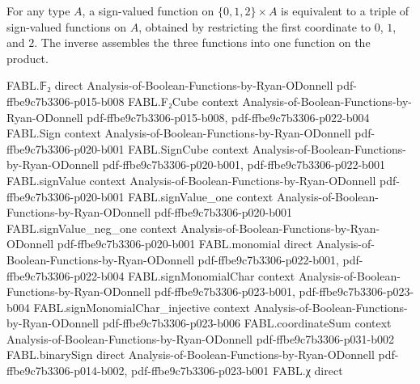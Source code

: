 \begin{definition}
\label{FABL.splitThreeBlocksEquiv}
\leanok
{}
For any type $A$, a sign-valued function on $\{0,1,2\}\times A$ is equivalent to a
triple of sign-valued functions on $A$, obtained by restricting the first coordinate to
$0$, $1$, and $2$. The inverse assembles the three functions into one function on the
product.
\end{definition}

\begin{theorem}
\label{FABL.signValue_majority_three}
\leanok
{}
\proofstep
  {FABL.𝔽₂}
  {direct}
  {Analysis-of-Boolean-Functions-by-Ryan-ODonnell}
  {pdf-ffbe9c7b3306-p015-b008}
\proofstep
  {FABL.F₂Cube}
  {context}
  {Analysis-of-Boolean-Functions-by-Ryan-ODonnell}
  {pdf-ffbe9c7b3306-p015-b008,
    pdf-ffbe9c7b3306-p022-b004}
\proofstep
  {FABL.Sign}
  {context}
  {Analysis-of-Boolean-Functions-by-Ryan-ODonnell}
  {pdf-ffbe9c7b3306-p020-b001}
\proofstep
  {FABL.SignCube}
  {context}
  {Analysis-of-Boolean-Functions-by-Ryan-ODonnell}
  {pdf-ffbe9c7b3306-p020-b001,
    pdf-ffbe9c7b3306-p022-b001}
\proofstep
  {FABL.signValue}
  {context}
  {Analysis-of-Boolean-Functions-by-Ryan-ODonnell}
  {pdf-ffbe9c7b3306-p020-b001}
\proofstep
  {FABL.signValue_one}
  {context}
  {Analysis-of-Boolean-Functions-by-Ryan-ODonnell}
  {pdf-ffbe9c7b3306-p020-b001}
\proofstep
  {FABL.signValue_neg_one}
  {context}
  {Analysis-of-Boolean-Functions-by-Ryan-ODonnell}
  {pdf-ffbe9c7b3306-p020-b001}
\proofstep
  {FABL.monomial}
  {direct}
  {Analysis-of-Boolean-Functions-by-Ryan-ODonnell}
  {pdf-ffbe9c7b3306-p022-b001,
    pdf-ffbe9c7b3306-p022-b004}
\proofstep
  {FABL.signMonomialChar}
  {context}
  {Analysis-of-Boolean-Functions-by-Ryan-ODonnell}
  {pdf-ffbe9c7b3306-p023-b001,
    pdf-ffbe9c7b3306-p023-b004}
\proofstep
  {FABL.signMonomialChar_injective}
  {context}
  {Analysis-of-Boolean-Functions-by-Ryan-ODonnell}
  {pdf-ffbe9c7b3306-p023-b006}
\proofstep
  {FABL.coordinateSum}
  {context}
  {Analysis-of-Boolean-Functions-by-Ryan-ODonnell}
  {pdf-ffbe9c7b3306-p031-b002}
\proofstep
  {FABL.binarySign}
  {direct}
  {Analysis-of-Boolean-Functions-by-Ryan-ODonnell}
  {pdf-ffbe9c7b3306-p014-b002,
    pdf-ffbe9c7b3306-p023-b001}
\proofstep
  {FABL.χ}
  {direct}

\end{theorem}
